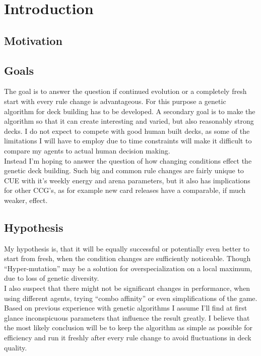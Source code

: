 \chapter{Introduction} 
\label{ch:intro}

\section{Motivation}
\label{sec:intro:motivation}

\section{Goals}
\label{sec:intro:goals}
The goal is to answer the question if continued evolution or a completely fresh start with every rule change is advantageous. For this purpose a genetic algorithm for deck building has to be developed. A secondary goal is to make the algorithm so that it can create interesting and varied, but also reasonably strong decks. I do not expect to compete with good human built decks, as some of the limitations I will have to employ due to time constraints will make it difficult to compare my agents to actual human decision making. \\
Instead I’m hoping to answer the question of how changing conditions effect the genetic deck building. Such big and common rule changes are fairly unique to CUE with it’s weekly energy and arena parameters, but it also has implications for other CCG’s, as for example new card releases have a comparable, if much weaker, effect.

\section{Hypothesis}
\label{sec:intro:hypothesis}
My hypothesis is, that it will be equally successful or potentially even better to start from fresh, when the condition changes are sufficiently noticeable. Though “Hyper-mutation” may be a solution for overspecialization on a local maximum, due to loss of genetic diversity. \\
I also suspect that there might not be significant changes in performance, when using different agents, trying “combo affinity” or even simplifications of the game. Based on previous experience with genetic algorithms I assume I’ll find at first glance inconspicuous parameters that influence the result greatly. I believe that the most likely conclusion will be to keep the algorithm as simple as possible for efficiency and run it freshly after every rule change to avoid fluctuations in deck quality.

